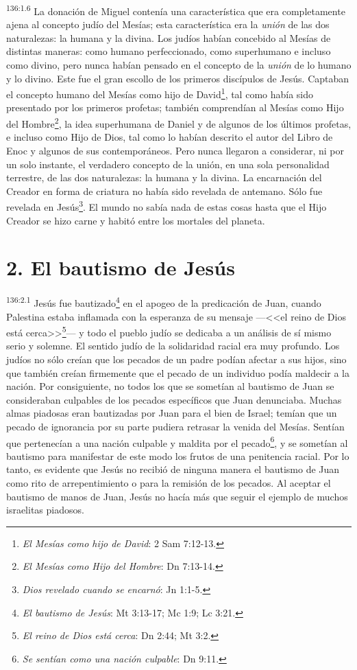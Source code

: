 \par 
\textsuperscript{136:1.6} La donación de Miguel contenía una característica que era completamente ajena al concepto judío del Mesías; esta característica era la \textit{unión} de las dos naturalezas: la humana y la divina. Los judíos habían concebido al Mesías de distintas maneras: como humano perfeccionado, como superhumano e incluso como divino, pero nunca habían pensado en el concepto de la \textit{unión} de lo humano y lo divino. Este fue el gran escollo de los primeros discípulos de Jesús. Captaban el concepto humano del Mesías como hijo de David\footnote{\textit{El Mesías como hijo de David}: 2 Sam 7:12-13.}, tal como había sido presentado por los primeros profetas; también comprendían al Mesías como Hijo del Hombre\footnote{\textit{El Mesías como Hijo del Hombre}: Dn 7:13-14.}, la idea superhumana de Daniel y de algunos de los últimos profetas, e incluso como Hijo de Dios, tal como lo habían descrito el autor del Libro de Enoc y algunos de sus contemporáneos. Pero nunca llegaron a considerar, ni por un solo instante, el verdadero concepto de la unión, en una sola personalidad terrestre, de las dos naturalezas: la humana y la divina. La encarnación del Creador en forma de criatura no había sido revelada de antemano. Sólo fue revelada en Jesús\footnote{\textit{Dios revelado cuando se encarnó}: Jn 1:1-5.}. El mundo no sabía nada de estas cosas hasta que el Hijo Creador se hizo carne y habitó entre los mortales del planeta.

\section*{2. El bautismo de Jesús}
\par 
\textsuperscript{136:2.1} Jesús fue bautizado\footnote{\textit{El bautismo de Jesús}: Mt 3:13-17; Mc 1:9; Lc 3:21.} en el apogeo de la predicación de Juan, cuando Palestina estaba inflamada con la esperanza de su mensaje ---<<el reino de Dios está cerca>>\footnote{\textit{El reino de Dios está cerca}: Dn 2:44; Mt 3:2.}--- y todo el pueblo judío se dedicaba a un análisis de sí mismo serio y solemne. El sentido judío de la solidaridad racial era muy profundo. Los judíos no sólo creían que los pecados de un padre podían afectar a sus hijos, sino que también creían firmemente que el pecado de un individuo podía maldecir a la nación. Por consiguiente, no todos los que se sometían al bautismo de Juan se consideraban culpables de los pecados específicos que Juan denunciaba. Muchas almas piadosas eran bautizadas por Juan para el bien de Israel; temían que un pecado de ignorancia por su parte pudiera retrasar la venida del Mesías. Sentían que pertenecían a una nación culpable y maldita por el pecado\footnote{\textit{Se sentían como una nación culpable}: Dn 9:11.}, y se sometían al bautismo para manifestar de este modo los frutos de una penitencia racial. Por lo tanto, es evidente que Jesús no recibió de ninguna manera el bautismo de Juan como rito de arrepentimiento o para la remisión de los pecados. Al aceptar el bautismo de manos de Juan, Jesús no hacía más que seguir el ejemplo de muchos israelitas piadosos.

